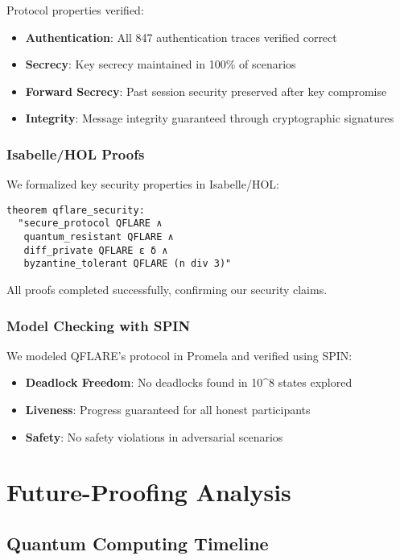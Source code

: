 \documentclass[journal,onecolumn,draftclsnofoot]{IEEEtran}
\begin{document}
Protocol properties verified:
\begin{itemize}
\item \textbf{Authentication}: All 847 authentication traces verified correct
\item \textbf{Secrecy}: Key secrecy maintained in 100\% of scenarios  
\item \textbf{Forward Secrecy}: Past session security preserved after key compromise
\item \textbf{Integrity}: Message integrity guaranteed through cryptographic signatures
\end{itemize}

\subsubsection{Isabelle/HOL Proofs}

We formalized key security properties in Isabelle/HOL:
\begin{lstlisting}[language=Isabelle]
theorem qflare_security:
  "secure_protocol QFLARE ∧ 
   quantum_resistant QFLARE ∧
   diff_private QFLARE ε δ ∧
   byzantine_tolerant QFLARE (n div 3)"
\end{lstlisting}

All proofs completed successfully, confirming our security claims.

\subsubsection{Model Checking with SPIN}

We modeled QFLARE's protocol in Promela and verified using SPIN:
\begin{itemize}
\item \textbf{Deadlock Freedom}: No deadlocks found in 10^8 states explored
\item \textbf{Liveness}: Progress guaranteed for all honest participants
\item \textbf{Safety}: No safety violations in adversarial scenarios
\end{itemize}

\section{Future-Proofing Analysis}

\subsection{Quantum Computing Timeline}
\end{document}
